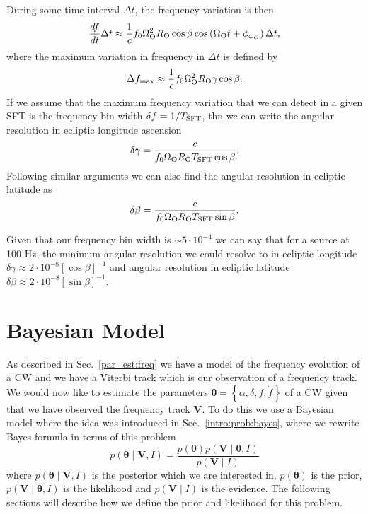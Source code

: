 During some time interval $\Delta t$, the frequency variation is then
\begin{equation}
    \frac{df}{dt} \Delta t \approx \frac{1}{c} f_0 \Omega_{\rm{O}}^2 R_{\rm{O}} \cos{\beta} \cos \left( \Omega_{\mathrm{O}} t + \phi_{\omega_{O}}  \right) \Delta t, 
\end{equation}
where the maximum variation in frequency in $\Delta t$ is defined by
\begin{equation}
    \Delta f_{\rm{max}} \approx \frac{1}{c} f_0 \Omega_{\rm{O}}^2 R_{\rm{O}} \gamma \cos{\beta}. 
\end{equation}
If we assume that the maximum frequency variation that we can detect in a given \gls{SFT} is the frequency bin width $\delta f = 1/T_{\rm{SFT}}$, thn we can write the angular resolution in ecliptic longitude ascension
\begin{equation}
    \delta \gamma = \frac{c}{f_0 \Omega_{\rm{O}} R_{\rm{O}} T_{\rm{SFT}} \cos \beta}.
\end{equation}
Following similar arguments we can also find the angular resolution in ecliptic latitude as
\begin{equation}
    \delta \beta = \frac{c}{f_0 \Omega_{\rm{O}} R_{\rm{O}} T_{\rm{SFT}} \sin \beta}.
\end{equation}

Given that our frequency bin width is $\sim 5 \cdot 10^{-4}$ we can say that for a source at 100 Hz, the minimum angular resolution we could resolve to in ecliptic longitude $\delta \gamma \approx 2 \cdot 10^{-8} [\cos{\beta}]^{-1}$ and angular resolution in ecliptic latitude $\delta \beta \approx 2 \cdot 10^{-8} [\sin{\beta}]^{-1}$.
%
%
\section{\label{par_est:bayes}Bayesian Model}
%
%

As described in Sec.~\ref{par_est:freq} we have a model of the frequency evolution of a \gls{CW} and we have a Viterbi track which is our observation of a frequency track.
We would now like to estimate the parameters $\bm{\theta} = \left\{\alpha, \delta, f, \dot{f} \right\}$ of a \gls{CW} given that we have observed the frequency track $\bm{V}$.
To do this we use a Bayesian model where the idea was introduced in Sec.~\ref{intro:prob:bayes}, where we rewrite Bayes formula in terms of this problem
\begin{equation}
    \label{par_est:bayes:eqn}
    p(\bm{\theta} \mid \bm{V}, I) = \frac{p(\bm{\theta}) p(\bm{V} \mid \bm{\theta}, I)}{p(\bm{V} \mid I)}
\end{equation}
where $p(\bm{\theta} \mid \bm{V}, I)$ is the posterior which we are interested in, $p(\bm{\theta})$ is the prior, $p(\bm{V} \mid \bm{\theta}, I)$ is the likelihood and $p(\bm{V} \mid I)$ is the evidence.
The following sections will describe how we define the prior and likelihood for this problem.

